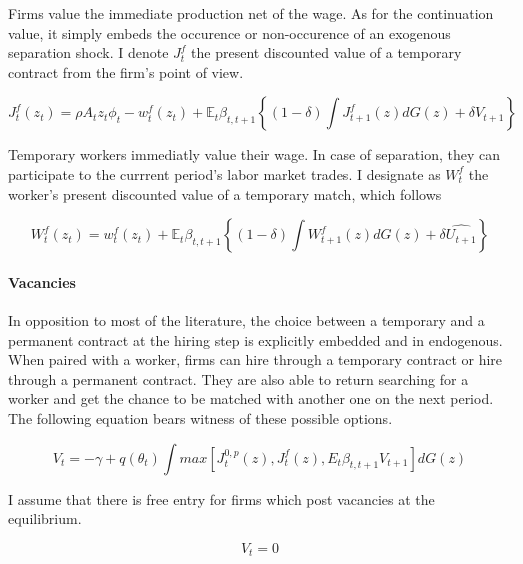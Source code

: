 Firms value the immediate production net of the wage. As for the continuation value, it simply embeds the occurence or non-occurence of an exogenous separation shock. I denote $J_t^f$ the present discounted value of a temporary contract from the firm's point of view. 

\begin{equation} \label{eq:def_jf}
J_{t}^f \left( z_t \right) = \rho A_t z_t \phi_t - w_{t}^{f} \left( z_t \right) + \mathbb{E}_{t} \beta_{t,t+1} \left\{ \left( 1-\delta \right)  \int J_{t+1}^{f} \left( z \right) dG(z) + \delta V_{t+1} \right\}
\end{equation}

Temporary workers immediatly value their wage. In case of separation, they can participate to the currrent period's labor market trades. I designate as $W_t^f$ the worker's present discounted value of a temporary match, which follows

\begin{equation} \label{eq:def_wf}
W_{t}^f \left( z_t \right) = w_{t}^{f} \left( z_t \right) + \mathbb{E}_{t} \beta_{t,t+1} \left\{ \left( 1-\delta \right)  \int W_{t+1}^{f} \left( z \right) dG(z) + \delta \widehat{U_{t+1}} \right\}
\end{equation}

\paragraph{Vacancies} In opposition to most of the literature, the choice between a temporary and a permanent contract at the hiring step is explicitly embedded and in endogenous. When paired with a worker, firms can hire through a temporary contract or hire through a permanent contract. They are also able to return searching for a worker and get the chance to be matched with another one on the next period. The following equation bears witness of these possible options.

\begin{equation} \label{eq:def_v}
V_t = - \gamma + q \left( \theta_{t} \right) \int max \left[ J_{t}^{0,p} \left( z \right) , J_{t}^{f} \left( z \right) ,  E_{t} \beta_{t,t+1} V_{t+1} \right] dG(z)
\end{equation}

I assume that there is free entry for firms which post vacancies at the equilibrium.

\begin{equation}
V_t = 0 \label{eq:free_entry}
\end{equation}

